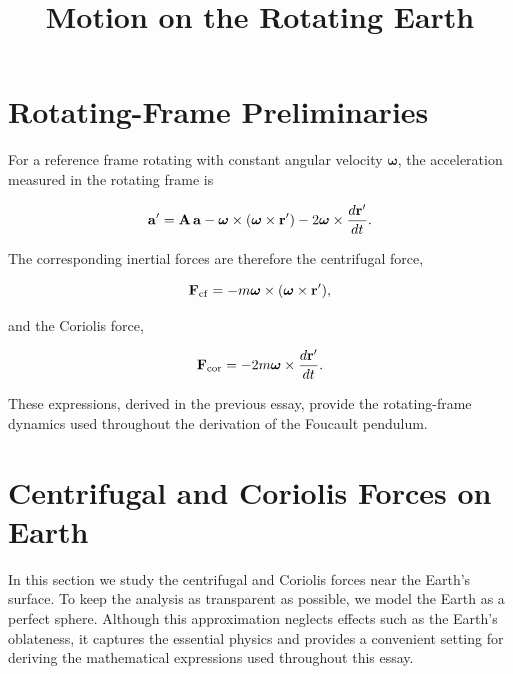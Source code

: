 \documentclass[12pt]{article}
\title{Motion on the Rotating Earth}
\author{}
\date{}
\begin{document}
\maketitle
\section{Rotating-Frame Preliminaries}

For a reference frame rotating with constant angular velocity
$\boldsymbol{\omega}$, the acceleration measured in the rotating frame is

\begin{equation}
  \vb{a}'
  =
  \vb{A}\,\vb{a}
  -
  \boldsymbol{\omega}\times
  (\boldsymbol{\omega}\times\vb{r}')
  -
  2\boldsymbol{\omega}\times
  \frac{d\vb{r}'}{dt}.
  \label{earth:acceleration-transformation}
\end{equation}

The corresponding inertial forces are therefore the centrifugal force,

\begin{equation}
  \vb{F}_{\mathrm{cf}}
  =
  -m\boldsymbol{\omega}\times
  (\boldsymbol{\omega}\times\vb{r}'),
  \label{earth:centrifugal-force-general}
\end{equation}

and the Coriolis force,

\begin{equation}
  \vb{F}_{\mathrm{cor}}
  =
  -2m\boldsymbol{\omega}\times
  \frac{d\vb{r}'}{dt}.
  \label{earth:coriolis-force-general}
\end{equation}

These expressions, derived in the previous essay, provide the rotating-frame
dynamics used throughout the derivation of the Foucault pendulum.
\section{Centrifugal and Coriolis Forces on Earth}

In this section we study the centrifugal and Coriolis forces near the Earth's surface. 
To keep the analysis as transparent as possible, we model the Earth as a perfect sphere. 
Although this approximation neglects effects such as the Earth's oblateness, it captures the essential
 physics and provides a convenient setting for deriving the 
 mathematical expressions used throughout this essay. \par
\end{document}
